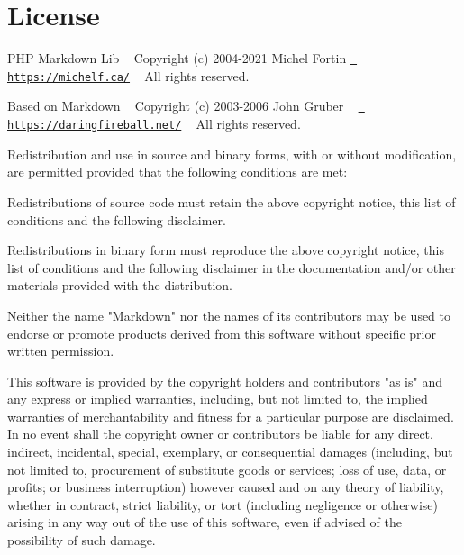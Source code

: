 \chapter{License}
\hypertarget{md_public_2glpi_2vendor_2michelf_2php-markdown_2_license}{}\label{md_public_2glpi_2vendor_2michelf_2php-markdown_2_license}
PHP Markdown Lib ~\newline
 Copyright (c) 2004-\/2021 Michel Fortin \href{https://michelf.ca/}{\texttt{ https\+://michelf.\+ca/}} ~\newline
 All rights reserved.

Based on Markdown ~\newline
 Copyright (c) 2003-\/2006 John Gruber ~\newline
 \href{https://daringfireball.net/}{\texttt{ https\+://daringfireball.\+net/}} ~\newline
 All rights reserved.

Redistribution and use in source and binary forms, with or without modification, are permitted provided that the following conditions are met\+:


\begin{DoxyItemize}
\item Redistributions of source code must retain the above copyright notice, this list of conditions and the following disclaimer.
\item Redistributions in binary form must reproduce the above copyright notice, this list of conditions and the following disclaimer in the documentation and/or other materials provided with the distribution.
\item Neither the name "{}\+Markdown"{} nor the names of its contributors may be used to endorse or promote products derived from this software without specific prior written permission.
\end{DoxyItemize}

This software is provided by the copyright holders and contributors "{}as is"{} and any express or implied warranties, including, but not limited to, the implied warranties of merchantability and fitness for a particular purpose are disclaimed. In no event shall the copyright owner or contributors be liable for any direct, indirect, incidental, special, exemplary, or consequential damages (including, but not limited to, procurement of substitute goods or services; loss of use, data, or profits; or business interruption) however caused and on any theory of liability, whether in contract, strict liability, or tort (including negligence or otherwise) arising in any way out of the use of this software, even if advised of the possibility of such damage. 
